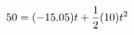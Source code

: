 \documentclass[preview]{standalone}
\begin{document}
\begin{align*}
\special{dvisvgm:raw <g id='unique000'>}50 = (-15.05)t + \frac{1}{2}(10)t^2\special{dvisvgm:raw </g>}
\end{align*}
\end{document}
